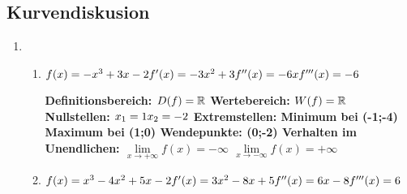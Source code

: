  \subsection{Kurvendiskusion}
  \begin{enumerate}
	\item %
	\begin{enumerate}
	\item
 $f(x)=-x^{3}+3x-2 \newline
 f'(x)=-3x^2+3 \newline
 f''(x)=-6x \newline
 f'''(x)=-6 \newline$
 \par
 \bfseries Definitionsbereich: $\normalfont D(f)=\mathbb{R}$ \newline
 \bfseries Wertebereich: $\normalfont W(f)=\mathbb{R}$ \newline
 \bfseries Nullstellen: \normalfont \newline $ x_{1}=1 \newline x_{2}=-2  $\newline \newline
 \bfseries Extremstellen: \normalfont \newline 
 Minimum bei (-1;-4)  \newline
 Maximum bei (1;0) \newline \newline
 \bfseries Wendepunkte: \normalfont (0;-2)\newline 
 \bfseries Verhalten im Unendlichen: \normalfont \newline
 $\lim\limits_{x \rightarrow +\infty}{f(x)=-\infty}$ \newline
 $\lim\limits_{x \rightarrow -\infty}{f(x)=+\infty}$
 
 \par
 \item
  $f(x)=x^3-4x^2+5x-2 \newline
 f'(x)=3x^2-8x+5 \newline
 f''(x)=6x-8 \newline
 f'''(x)=6 \newline$
 

\end{enumerate}
\end{enumerate}
